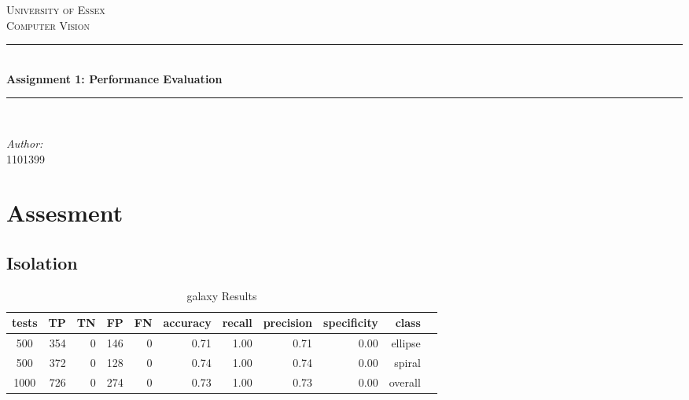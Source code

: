 \documentclass{article}
\newcommand{\HRule}{\rule{\linewidth}{0.5mm}}
\begin{document}
\begin{titlepage}
\begin{center}

\textsc{\LARGE University of Essex}\\[1.5cm]
\textsc{\Large Computer Vision}\\[0.5cm]

\HRule \\[0.4cm]
{ \huge \bfseries Assignment 1: Performance Evaluation \\[0.4cm] }
\HRule \\[1.5cm]

\begin{minipage}{1.0\textwidth}
\begin{flushleft} \large
\emph{Author:}\\
1101399
\end{flushleft}
\end{minipage}

\vfill

\end{center}
\end{titlepage}

\section{Assesment}
\subsection{Isolation}

\begin{table}[h]
\caption{galaxy Results}
\centering
\begin{tabular}{c rrrrrrrrrr}
\hline \hline
tests & TP & TN & FP & FN & accuracy & recall & precision & specificity & class \\[0.5ex]
\hline
500 & 354 & 0 & 146 & 0 & 0.71 & 1.00 & 0.71 & 0.00 & ellipse \\
500 & 372 & 0 & 128 & 0 & 0.74 & 1.00 & 0.74 & 0.00 & spiral \\
1000 & 726 & 0 & 274 & 0 & 0.73 & 1.00 & 0.73 & 0.00 & overall \\
\hline
\end{tabular}
\end{table}
\end{document}

